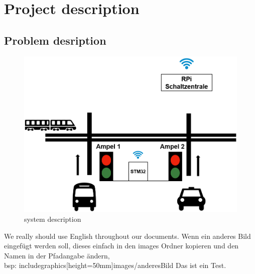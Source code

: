 \section{Project description}
\label{chapter1}

\subsection{Problem desription}

\begin{figure}[h]
	\includegraphics[height=50mm;left=50mm]{images/system}
	\centering
	\caption{system description}
	\label{fig:system}
\end{figure}

We really should use English throughout our documents.
Wenn ein anderes Bild eingefügt werden soll, dieses einfach in den images Ordner kopieren und den Namen in der Pfadangabe ändern, \\ bsp: includegraphics[height=50mm]{images/anderesBild}
Das ist ein Test.